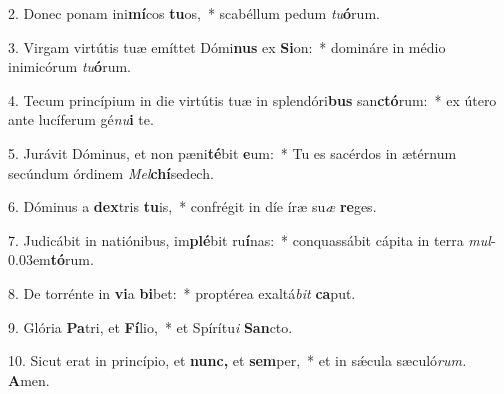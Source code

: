 \item 2. Donec ponam ini\textbf{mí}cos \textbf{tu}os,~* scabéllum pedum \textit{tu}\textbf{ó}rum.

\item 3. Virgam virtútis tuæ emíttet Dómi\textbf{nus} ex \textbf{Si}on:~* domináre in médio inimicórum \textit{tu}\textbf{ó}rum.

\item 4. Tecum princípium in die virtútis tuæ in splendóri\textbf{bus} san\textbf{ctó}rum:~* ex útero ante lucíferum gé\textit{nu}\textbf{i} te.

\item 5. Jurávit Dóminus, et non pæni\textbf{té}bit \textbf{e}um:~* Tu es sacérdos in ætérnum secúndum órdinem \textit{Mel}\textbf{chí}sedech.

\item 6.  Dóminus a \textbf{dex}tris \textbf{tu}is,~* confrégit in díe íræ su\hspace{0.03em}\textit{æ} \textbf{re}ges.

\item 7. Judicábit in natiónibus, im\textbf{plé}bit ru\textbf{í}nas:~* conquassábit cápita in terra \textit{mul}\kern -0.03em\textbf{tó}rum.

\item 8. De torrénte in \textbf{vi}a \textbf{bi}bet:~* proptérea exaltá\textit{bit} \textbf{ca}put.

\item 9. Glória \textbf{Pa}tri, et \textbf{Fí}lio,~* et Spírítu\textit{i} \textbf{San}cto.

\item 10. Sicut erat in princípio, et \textbf{nunc,} et \textbf{sem}per,~* et in sǽcula sæculó\textit{rum.} \textbf{A}men.